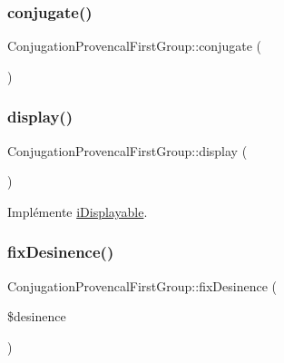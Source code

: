 \subsubsection{\texorpdfstring{conjugate()}{conjugate()}}
{\footnotesize\ttfamily Conjugation\+Provencal\+First\+Group\+::conjugate (\begin{DoxyParamCaption}{ }\end{DoxyParamCaption})\hspace{0.3cm}{\ttfamily [protected]}}

\hypertarget{class_conjugation_provencal_first_group_a6bd7d4bb8434586bf0ac5836a51d0022}{}\label{class_conjugation_provencal_first_group_a6bd7d4bb8434586bf0ac5836a51d0022} 
\subsubsection{\texorpdfstring{display()}{display()}}
{\footnotesize\ttfamily Conjugation\+Provencal\+First\+Group\+::display (\begin{DoxyParamCaption}{ }\end{DoxyParamCaption})}



Implémente \hyperlink{interfacei_displayable_a0264fd455c876e897f754cf85f1681ca}{i\+Displayable}.

\hypertarget{class_conjugation_provencal_first_group_a65b702345db86895aecf34b88f0134a7}{}\label{class_conjugation_provencal_first_group_a65b702345db86895aecf34b88f0134a7} 
\subsubsection{\texorpdfstring{fix\+Desinence()}{fixDesinence()}}
{\footnotesize\ttfamily Conjugation\+Provencal\+First\+Group\+::fix\+Desinence (\begin{DoxyParamCaption}\item[{}]{\$desinence }\end{DoxyParamCaption})\hspace{0.3cm}{\ttfamily [protected]}}

\hypertarget{class_conjugation_provencal_first_group_a58519c759619a7566d20de71b6c93dc6}{}\label{class_conjugation_provencal_first_group_a58519c759619a7566d20de71b6c93dc6} 
